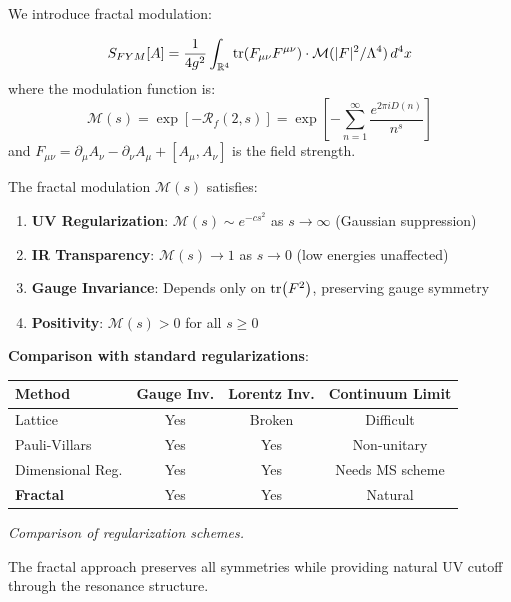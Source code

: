 We introduce fractal modulation:

\begin{defn}\label{def:fym-action}
\begin{equation}
S_{FYM}[A] = \frac{1}{4g^2} \int_{\mathbb{R}^4} \tr(F_{\mu\nu}F^{\mu\nu}) \cdot \mathcal{M}(|F|^2/\Lambda^4) \, d^4x
\end{equation}
where the modulation function is:
\begin{equation}
\mathcal{M}(s) = \exp\left[-\mathcal{R}_f(2, s)\right] = \exp\left[-\sum_{n=1}^{\infty} \frac{e^{2\pi i D(n)}}{n^s}\right]
\end{equation}
and $F_{\mu\nu} = \partial_\mu A_\nu - \partial_\nu A_\mu + [A_\mu, A_\nu]$ is the field strength.
\end{defn}

\begin{proposition}\label{prop:modulation-properties}
The fractal modulation $\mathcal{M}(s)$ satisfies:
\begin{enumerate}
\item \textbf{UV Regularization}: $\mathcal{M}(s) \sim e^{-cs^2}$ as $s \to \infty$ (Gaussian suppression)
\item \textbf{IR Transparency}: $\mathcal{M}(s) \to 1$ as $s \to 0$ (low energies unaffected)
\item \textbf{Gauge Invariance}: Depends only on $\tr(F^2)$, preserving gauge symmetry
\item \textbf{Positivity}: $\mathcal{M}(s) > 0$ for all $s \geq 0$
\end{enumerate}
\end{proposition}

\begin{level3}
\textbf{Comparison with standard regularizations}:

\begin{center}
\begin{tabular}{lccc}
\toprule
\textbf{Method} & \textbf{Gauge Inv.} & \textbf{Lorentz Inv.} & \textbf{Continuum Limit} \\
\midrule
Lattice & Yes & Broken & Difficult \\
Pauli-Villars & Yes & Yes & Non-unitary \\
Dimensional Reg. & Yes & Yes & Needs MS scheme \\
\textbf{Fractal} & Yes & Yes & Natural \\
\bottomrule
\end{tabular}

\smallskip
\textit{Comparison of regularization schemes.}
\end{center}

The fractal approach preserves all symmetries while providing natural UV cutoff through the resonance structure.
\end{level3}

